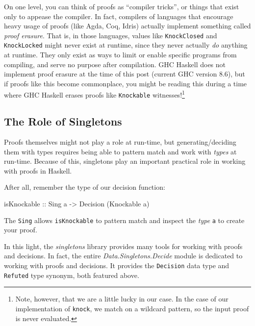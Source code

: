 \documentclass[]{article}
\newenvironment{Shaded}{}{}
\newcommand{\DataTypeTok}[1]{\textcolor[rgb]{0.56,0.13,0.00}{#1}}
\newcommand{\NormalTok}[1]{#1}
\newcommand{\OtherTok}[1]{\textcolor[rgb]{0.00,0.44,0.13}{#1}}
\begin{document}
On one level, you can think of proofs as ``compiler tricks'', or things that
exist only to appease the compiler. In fact, compilers of languages that
encourage heavy usage of proofs (like Agda, Coq, Idris) actually implement
something called \emph{proof erasure}. That is, in those languages, values like
\texttt{KnockClosed} and \texttt{KnockLocked} might never exist at runtime,
since they never actually \emph{do} anything at runtime. They only exist as ways
to limit or enable specific programs from compiling, and serve no purpose after
compilation. GHC Haskell does not implement proof erasure at the time of this
post (current GHC version 8.6), but if proofs like this become commonplace, you
might be reading this during a time where GHC Haskell erases proofs like
\texttt{Knockable} witnesses!\footnote{Note, however, that we are a little lucky
  in our case. In the case of our implementation of \texttt{knock}, we match on
  a wildcard pattern, so the input proof is never evaluated.}

\hypertarget{the-role-of-singletons}{%
\subsection{The Role of Singletons}\label{the-role-of-singletons}}

Proofs themselves might not play a role at run-time, but generating/deciding
them with types requires being able to pattern match and work with \emph{types}
at run-time. Because of this, singletons play an important practical role in
working with proofs in Haskell.

After all, remember the type of our decision function:

\begin{Shaded}
\begin{Highlighting}[]
\OtherTok{isKnockable ::} \DataTypeTok{Sing}\NormalTok{ a }\OtherTok{->} \DataTypeTok{Decision}\NormalTok{ (}\DataTypeTok{Knockable}\NormalTok{ a)}
\end{Highlighting}
\end{Shaded}

The \texttt{Sing} allows \texttt{isKnockable} to pattern match and inspect the
\emph{type} \texttt{a} to create your proof.

In this light, the \emph{singletons} library provides many tools for working
with proofs and decisions. In fact, the entire \emph{Data.Singletons.Decide}
module is dedicated to working with proofs and decisions. It provides the
\texttt{Decision} data type and \texttt{Refuted} type synonym, both featured
above.
\end{document}
